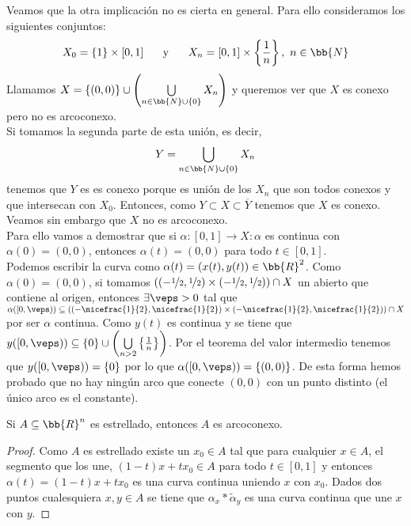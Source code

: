 \begin{ejemplo}
    Veamos que la otra implicación no es cierta en general. Para ello consideramos los siguientes conjuntos: 
    \begin{gather*}
        X_0=\{1\}\times [0,1] \hspace{0.5cm}\text{ y } \hspace{0.5cm} X_n = [0,1]\times \left\{\frac{1}{n}\right\},\ n\in \bb{N}
    \end{gather*}
    Llamamos $X=\{(0,0)\}\cup \left(\bigcup\limits_{n\in \bb{N}\cup \{0\}}X_n\right)$ y queremos ver que $X$ es conexo pero no es arcoconexo.\\

    Si tomamos la segunda parte de esta unión, es decir, 
    \begin{gather*}
        Y=\bigcup\limits_{n\in \bb{N}\cup \{0\}}X_n
    \end{gather*}
    tenemos que $Y$ es es conexo porque es unión de los $X_n$ que son todos conexos y que intersecan con $X_0$. Entonces, como $Y\subset X \subset \overline{Y}$ tenemos que $X$ es conexo. Veamos sin embargo que $X$ no es arcoconexo.\\

    Para ello vamos a demostrar que si $\alpha:[0,1]\to X : \alpha$ es continua con $\alpha(0)=(0,0)$, entonces $\alpha(t)=(0,0)$ para todo $t\in [0,1]$.\\

    Podemos escribir la curva como $\alpha(t) = (x(t), y(t))\in \bb{R}^2$. Como $\alpha(0)=(0,0)$, si tomamos $((-\nicefrac{1}{2}, \nicefrac{1}{2})\times (-\nicefrac{1}{2}, \nicefrac{1}{2})) \cap X$ un abierto que contiene al origen, entonces $\exists \veps > 0$ tal que $\alpha([0,\veps))\subseteq ((-\nicefrac{1}{2}, \nicefrac{1}{2})\times (-\nicefrac{1}{2}, \nicefrac{1}{2})) \cap X$ por ser $\alpha$ continua. Como $y(t)$ es continua y se tiene que $y([0,\veps))\subseteq \{0\}\cup\left(\bigcup\limits_{n>2} \left\{\frac{1}{n}\right\}\right)$. Por el teorema del valor intermedio tenemos que $y([0,\veps)) = \{0\}$ por lo que $\alpha([0,\veps))=\{(0,0)\}$. De esta forma hemos probado que no hay ningún arco que conecte $(0,0)$ con un punto distinto (el único arco es el constante).
\end{ejemplo}

\begin{teo}
    Si $A\subseteq \bb{R}^n$ es estrellado, entonces $A$ es arcoconexo.
    \begin{proof}
        Como $A$ es estrellado existe un $x_0\in A$ tal que para cualquier $x\in A$, el segmento que los une, $(1-t)x + tx_0\in A$ para todo $t\in [0,1]$ y entonces $\alpha(t)=(1-t)x+tx_0$ es una curva continua uniendo $x$ con $x_0$. Dados dos puntos cualesquiera $x,y \in A$ se tiene que $\alpha_x\ast \tilde{\alpha}_y$ es una curva continua que une $x$ con $y$.
    \end{proof}
\end{teo}

